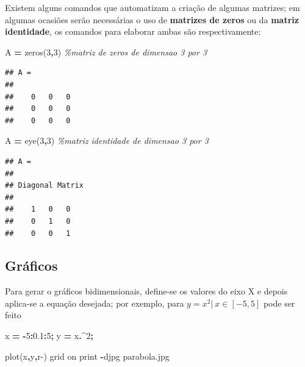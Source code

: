 \documentclass[
]{book}
\newenvironment{Shaded}{\begin{snugshade}}{\end{snugshade}}
\newcommand{\CommentTok}[1]{\textcolor[rgb]{0.56,0.35,0.01}{\textit{#1}}}
\newcommand{\FloatTok}[1]{\textcolor[rgb]{0.00,0.00,0.81}{#1}}
\newcommand{\FunctionTok}[1]{\textcolor[rgb]{0.00,0.00,0.00}{#1}}
\newcommand{\NormalTok}[1]{#1}
\newcommand{\OperatorTok}[1]{\textcolor[rgb]{0.81,0.36,0.00}{\textbf{#1}}}
\newcommand{\StringTok}[1]{\textcolor[rgb]{0.31,0.60,0.02}{#1}}
\begin{document}
Existem alguns comandos que automatizam a criação de algumas matrizes; em algumas ocasiões serão necessárias o uso de \textbf{matrizes de zeros} ou da \textbf{matriz identidade}, os comandos para elaborar ambas são respectivamente:

\begin{Shaded}
\begin{Highlighting}[]
\NormalTok{A }\OperatorTok{=} \FunctionTok{zeros}\NormalTok{(}\FloatTok{3}\OperatorTok{,}\FloatTok{3}\NormalTok{) }\CommentTok{\%matriz de zeros de dimensao 3 por 3}
\end{Highlighting}
\end{Shaded}

\begin{verbatim}
## A =
## 
##    0   0   0
##    0   0   0
##    0   0   0
\end{verbatim}

\begin{Shaded}
\begin{Highlighting}[]
\NormalTok{A }\OperatorTok{=} \FunctionTok{eye}\NormalTok{(}\FloatTok{3}\OperatorTok{,}\FloatTok{3}\NormalTok{) }\CommentTok{\%matriz identidade de dimensao 3 por 3}
\end{Highlighting}
\end{Shaded}

\begin{verbatim}
## A =
## 
## Diagonal Matrix
## 
##    1   0   0
##    0   1   0
##    0   0   1
\end{verbatim}

\hypertarget{gruxe1ficos}{%
\subsection{Gráficos}\label{gruxe1ficos}}

Para gerar o gráficos bidimensionais, define-se os valores do eixo X e depois aplica-se a equação desejada; por exemplo, para \(y = x^2 | \ x \in [-5,5]\) pode ser feito

\begin{Shaded}
\begin{Highlighting}[]
\NormalTok{x }\OperatorTok{=} \OperatorTok{{-}}\FloatTok{5}\OperatorTok{:}\FloatTok{0.1}\OperatorTok{:}\FloatTok{5}\OperatorTok{;}
\NormalTok{y }\OperatorTok{=}\NormalTok{ x}\OperatorTok{.\^{}}\FloatTok{2}\OperatorTok{;}

\FunctionTok{plot}\NormalTok{(x}\OperatorTok{,}\NormalTok{y}\OperatorTok{,}\StringTok{\textquotesingle{}r{-}\textquotesingle{}}\NormalTok{)}
\FunctionTok{grid}\NormalTok{ on}
\FunctionTok{print} \OperatorTok{{-}}\NormalTok{djpg parabola.jpg}
\end{Highlighting}
\end{Shaded}
\end{document}
